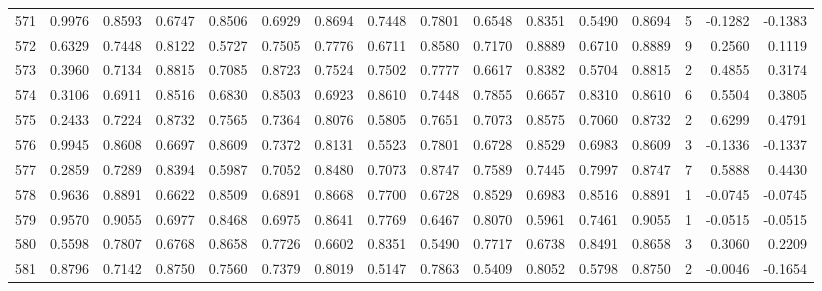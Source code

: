 \begin{tabular}{lrrrrrrrrrrrrrrr}
571 &      0.9976 &  0.8593 &  0.6747 &  0.8506 &  0.6929 &  0.8694 &  0.7448 &  0.7801 &  0.6548 &  0.8351 &   0.5490 &     0.8694 &      5 &                   -0.1282 &                    -0.1383 \\
572 &      0.6329 &  0.7448 &  0.8122 &  0.5727 &  0.7505 &  0.7776 &  0.6711 &  0.8580 &  0.7170 &  0.8889 &   0.6710 &     0.8889 &      9 &                    0.2560 &                     0.1119 \\
573 &      0.3960 &  0.7134 &  0.8815 &  0.7085 &  0.8723 &  0.7524 &  0.7502 &  0.7777 &  0.6617 &  0.8382 &   0.5704 &     0.8815 &      2 &                    0.4855 &                     0.3174 \\
574 &      0.3106 &  0.6911 &  0.8516 &  0.6830 &  0.8503 &  0.6923 &  0.8610 &  0.7448 &  0.7855 &  0.6657 &   0.8310 &     0.8610 &      6 &                    0.5504 &                     0.3805 \\
575 &      0.2433 &  0.7224 &  0.8732 &  0.7565 &  0.7364 &  0.8076 &  0.5805 &  0.7651 &  0.7073 &  0.8575 &   0.7060 &     0.8732 &      2 &                    0.6299 &                     0.4791 \\
576 &      0.9945 &  0.8608 &  0.6697 &  0.8609 &  0.7372 &  0.8131 &  0.5523 &  0.7801 &  0.6728 &  0.8529 &   0.6983 &     0.8609 &      3 &                   -0.1336 &                    -0.1337 \\
577 &      0.2859 &  0.7289 &  0.8394 &  0.5987 &  0.7052 &  0.8480 &  0.7073 &  0.8747 &  0.7589 &  0.7445 &   0.7997 &     0.8747 &      7 &                    0.5888 &                     0.4430 \\
578 &      0.9636 &  0.8891 &  0.6622 &  0.8509 &  0.6891 &  0.8668 &  0.7700 &  0.6728 &  0.8529 &  0.6983 &   0.8516 &     0.8891 &      1 &                   -0.0745 &                    -0.0745 \\
579 &      0.9570 &  0.9055 &  0.6977 &  0.8468 &  0.6975 &  0.8641 &  0.7769 &  0.6467 &  0.8070 &  0.5961 &   0.7461 &     0.9055 &      1 &                   -0.0515 &                    -0.0515 \\
580 &      0.5598 &  0.7807 &  0.6768 &  0.8658 &  0.7726 &  0.6602 &  0.8351 &  0.5490 &  0.7717 &  0.6738 &   0.8491 &     0.8658 &      3 &                    0.3060 &                     0.2209 \\
581 &      0.8796 &  0.7142 &  0.8750 &  0.7560 &  0.7379 &  0.8019 &  0.5147 &  0.7863 &  0.5409 &  0.8052 &   0.5798 &     0.8750 &      2 &                   -0.0046 &                    -0.1654 \\

\end{tabular}
